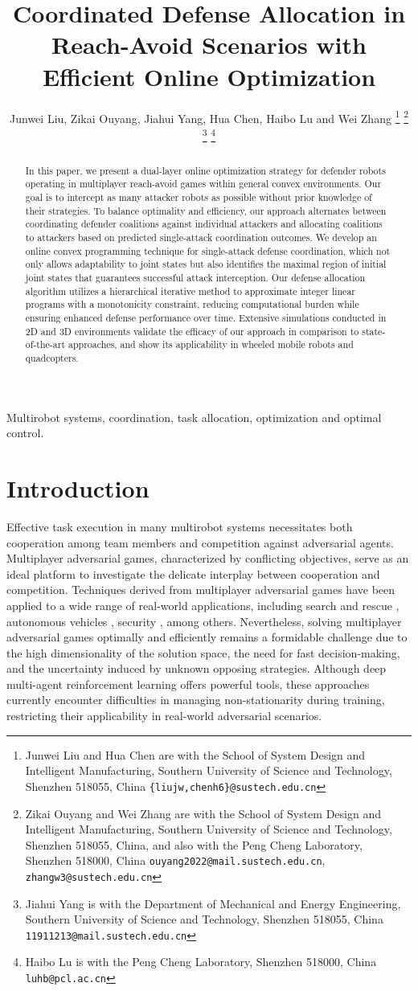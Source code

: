 \documentclass[journal]{IEEEtran}
\title{\LARGE \bf
Coordinated Defense Allocation in Reach-Avoid Scenarios with Efficient Online Optimization
}
\author{Junwei Liu, Zikai Ouyang, Jiahui Yang, Hua Chen, Haibo Lu and Wei Zhang
\thanks{Junwei Liu and Hua Chen are with the School of System Design and Intelligent Manufacturing, Southern University of Science and Technology, Shenzhen 518055, China {\tt\small \{liujw,chenh6\}@sustech.edu.cn}
}
\thanks{Zikai Ouyang and Wei Zhang are with the School of System Design and Intelligent Manufacturing, Southern University of Science and Technology, Shenzhen 518055, China, and also with the Peng Cheng Laboratory, Shenzhen 518000, China {\tt\small ouyang2022@mail.sustech.edu.cn}, {\tt\small zhangw3@sustech.edu.cn}}
\thanks{Jiahui Yang is with the Department of Mechanical and Energy Engineering, Southern University of Science and Technology, Shenzhen 518055, China {\tt\small 11911213@mail.sustech.edu.cn}}
\thanks{Haibo Lu is with the Peng Cheng Laboratory, Shenzhen 518000, China {\tt\small luhb@pcl.ac.cn}}
}
\newcommand{\1}{\mathbf{1}}
\begin{document}
\maketitle

\begin{abstract}
In this paper, we present a dual-layer online optimization strategy for defender robots operating in multiplayer reach-avoid games within general convex environments. Our goal is to intercept as many attacker robots as possible without prior knowledge of their strategies. To balance optimality and efficiency, our approach alternates between coordinating defender coalitions against individual attackers and allocating coalitions to attackers based on predicted single-attack coordination outcomes. We develop an online convex programming technique for single-attack defense coordination, which not only allows adaptability to joint states but also identifies the maximal region of initial joint states that guarantees successful attack interception. Our defense allocation algorithm utilizes a hierarchical iterative method to approximate integer linear programs with a monotonicity constraint, reducing computational burden while ensuring enhanced defense performance over time. Extensive simulations conducted in 2D and 3D environments validate the efficacy of our approach in comparison to state-of-the-art approaches, and show its applicability in wheeled mobile robots and quadcopters.
\end{abstract}

\begin{IEEEkeywords}
Multirobot systems, coordination, task allocation, optimization and optimal control.
\end{IEEEkeywords}

\section{Introduction}

Effective task execution in many multirobot systems necessitates both cooperation among team members and competition against adversarial agents. Multiplayer adversarial games, characterized by conflicting objectives, serve as an ideal platform to investigate the delicate interplay between cooperation and competition. Techniques derived from multiplayer adversarial games have been applied to a wide range of real-world applications, including search and rescue \cite{vidal2002probabilistic}, autonomous vehicles \cite{bansal2017hamilton}, security \cite{robin2016multi}, among others. Nevertheless, solving multiplayer adversarial games optimally and efficiently remains a formidable challenge due to the high dimensionality of the solution space, the need for fast decision-making, and the uncertainty induced by unknown opposing strategies. Although deep multi-agent reinforcement learning \cite{lowe2017multi,rashid2020monotonic,zhang2021multi} offers powerful tools, these approaches currently encounter difficulties in managing non-stationarity during training, restricting their applicability in real-world adversarial scenarios.
\end{document}
